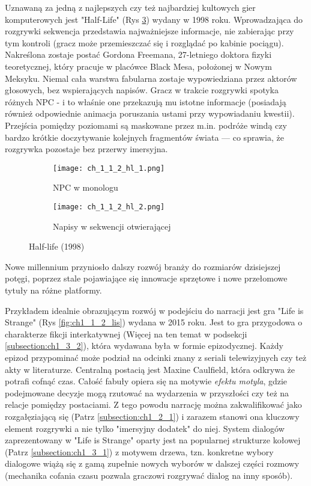 Uznawaną za jedną z najlepszych czy też najbardziej kultowych gier komputerowych jest
"Half-Life" (Rys \ref{fig:ch1_1_2_hl}) wydany w 1998 roku.
Wprowadzająca do rozgrywki sekwencja przedstawia najważniejsze informacje, nie zabierając
przy tym kontroli (gracz może przemieszczać się i rozglądać po kabinie pociągu). Nakreślona zostaje
postać Gordona Freemana, 27-letniego doktora fizyki teoretycznej, który pracuje w placówce Black Mesa,
położonej w Nowym Meksyku. Niemal cała warstwa fabularna zostaje wypowiedziana przez aktorów głosowych,
bez wspierających napisów. Gracz w trakcie rozgrywki spotyka różnych NPC - i to właśnie one
przekazują mu istotne informacje (posiadają również odpowiednie animacja poruszania ustami przy
wypowiadaniu kwestii). Przejścia pomiędzy poziomami są maskowane przez m.in. podróże windą czy
bardzo krótkie doczytywanie kolejnych fragmentów świata --- co sprawia, że rozgrywka pozostaje
bez przerwy imersyjna.

\begin{figure}[h]
	\begin{subfigure}{0.49\textwidth}
		\caption{NPC w monologu}
		\texttt{[image: ch\_1\_1\_2\_hl\_1.png]}
		\label{subfig:ch_1_1_2_hl_1}
	\end{subfigure}
	\begin{subfigure}{0.49\textwidth}
		\caption{Napisy w sekwencji otwierającej}
		\texttt{[image: ch\_1\_1\_2\_hl\_2.png]}
		\label{subfig:ch_1_1_2_hl_2}
	\end{subfigure}
	\caption{Half-life (1998)}
	\label{fig:ch1_1_2_hl}
\end{figure}

\newpage

Nowe millennium przyniosło dalszy rozwój branży do rozmiarów dzisiejszej potęgi, poprzez stale
pojawiające się innowacje sprzętowe i nowe przełomowe tytuły na różne platformy.

Przykładem idealnie obrazującym rozwój w podejściu do narracji jest gra "Life is Strange" (Rys \ref{fig:ch1_1_2_lis})
wydana w 2015 roku. Jest to gra przygodowa o charakterze fikcji interkatywnej (Więcej na ten temat
w podsekcji \ref{subsection:ch1_3_2}), która wydawana była w formie epizodycznej. Każdy epizod
przypominać może podział na odcinki znany z seriali telewizyjnych czy też akty w literaturze.
Centralną postacią jest Maxine Caulfield, która odkrywa że potrafi cofnąć czas. Całość fabuły opiera się
na motywie \textit{efektu motyla}, gdzie podejmowane decyzje mogą rzutować na wydarzenia w przyszłości czy
też na relacje pomiędzy postaciami. Z tego powodu narrację można zakwalifikować jako rozgałęziającą się
(Patrz \ref{subsection:ch1_2_1}) i zarazem stanowi ona kluczowy element rozgrywki a nie tylko
"imersyjny dodatek" do niej. System dialogów zaprezentowany w "Life is Strange" oparty jest na popularnej
strukturze kołowej (Patrz \ref{subsection:ch1_3_1}) z motywem drzewa, tzn. konkretne wybory dialogowe
wiążą się z gamą zupełnie nowych wyborów w dalszej części rozmowy (mechanika cofania czasu pozwala
graczowi rozgrywać dialog na inny sposób).

